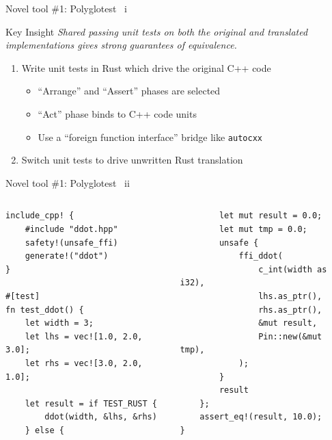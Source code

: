 \documentclass[10pt,aspectratio=169]{beamer}
\begin{document}
\begin{frame}{Novel tool \#1: Polyglotest \ i}
    \begin{alertblock}{Key Insight}
        \vspace*{0.25cm}
        \textit{Shared passing unit tests on both the original and translated implementations gives strong guarantees of equivalence.}
    \end{alertblock}
    \vspace*{0.5cm}
    \begin{enumerate}
        \item<2-> Write unit tests in Rust which drive the original C++ code
        \begin{itemize}
            \item ``Arrange'' and ``Assert'' phases are selected
            \item ``Act'' phase binds to C++ code units
            \item Use a ``foreign function interface'' bridge like \texttt{autocxx}
        \end{itemize}
        \item<3-> Switch unit tests to drive unwritten Rust translation
    \end{enumerate}
    \vspace*{0.5cm}
\end{frame}

\begin{frame}[fragile]{Novel tool \#1: Polyglotest \ ii}
    \begin{columns}[T,onlytextwidth]
        \centering
            \begin{verbatim}
include_cpp! {
    #include "ddot.hpp"
    safety!(unsafe_ffi)
    generate!("ddot")
}

#[test]
fn test_ddot() {
    let width = 3;
    let lhs = vec![1.0, 2.0, 3.0];
    let rhs = vec![3.0, 2.0, 1.0];

    let result = if TEST_RUST {
        ddot(width, &lhs, &rhs)
    } else {
            \end{verbatim}
            \begin{verbatim}
        let mut result = 0.0;
        let mut tmp = 0.0;
        unsafe {
            ffi_ddot(
                c_int(width as i32),
                lhs.as_ptr(),
                rhs.as_ptr(),
                &mut result,
                Pin::new(&mut tmp),
            );
        }
        result
    };
    assert_eq!(result, 10.0);
}
            \end{verbatim}
    \end{columns}
\end{frame}
\end{document}
